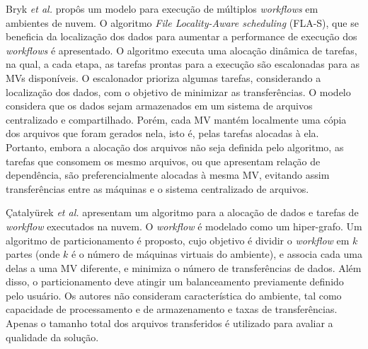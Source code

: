 Bryk \textit{et al.} \cite{Bryk} propôs um modelo para execução de múltiplos \textit{workflows} em ambientes de nuvem. O algoritmo \textit{File Locality-Aware scheduling} (FLA-S), que se beneficia da localização dos dados para aumentar a performance de execução dos \textit{workflows} é apresentado. O algoritmo executa uma alocação dinâmica de tarefas, na qual, a cada etapa, as tarefas prontas para a execução são escalonadas para as MVs disponíveis. O escalonador prioriza algumas tarefas, considerando a localização dos dados, com o objetivo de minimizar as transferências. O modelo considera que os dados sejam armazenados em um sistema de arquivos centralizado e compartilhado. Porém, cada MV mantém localmente uma cópia dos arquivos que foram gerados nela, isto é, pelas tarefas alocadas à ela. Portanto, embora a alocação dos arquivos não seja definida pelo algoritmo, as tarefas que consomem os mesmo arquivos, ou que apresentam relação de dependência, são preferencialmente alocadas à mesma MV, evitando assim transferências entre as máquinas e o sistema centralizado de arquivos.


Çatalyürek {\it et al.} \cite{Catal2011} apresentam um algoritmo para a alocação de dados e tarefas de \textit{workflow} executados na nuvem. O \textit{workflow} é modelado como um hiper-grafo. Um algoritmo de particionamento é proposto, cujo objetivo é dividir o \textit{workflow} em $k$ partes (onde $k$ é o número de máquinas virtuais do ambiente), e associa cada uma delas a uma MV diferente, e minimiza o número de transferências de dados. Além disso, o particionamento deve atingir um balanceamento previamente definido pelo usuário. Os autores não consideram característica do ambiente, tal como capacidade de processamento e de armazenamento e taxas de transferências. Apenas o tamanho total dos arquivos transferidos é utilizado para avaliar a qualidade da solução.

